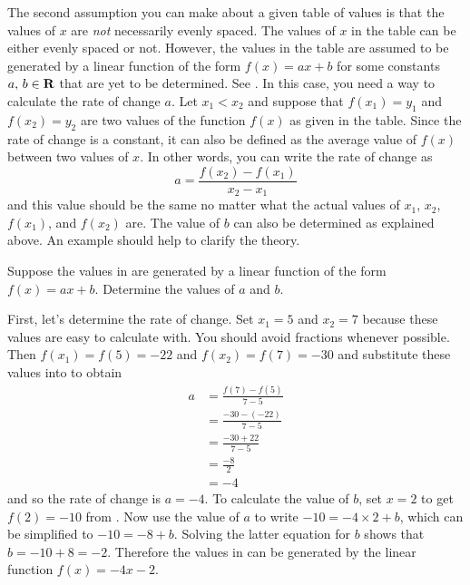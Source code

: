 \documentclass[a4paper,oneside,12pt]{article}
\begin{document}
The second assumption you can make about a given table of values is
that the values of $x$ are \emph{not} necessarily evenly spaced.  The
values of $x$ in the table can be either evenly spaced or not.
However, the values in the table are assumed to be generated by a
linear function of the form $f(x) = ax + b$ for some constants
${a},\, {b} \in \mathbf{R}$ that are yet to be determined.  See
.  In this case, you
need a way to calculate the rate of change $a$.  Let $x_1 < x_2$ and
suppose that $f(x_1) = y_1$ and $f(x_2) = y_2$ are two values of the
function $f(x)$ as given in the table.  Since the rate of change is a
constant, it can also be defined as the average value of $f(x)$
between two values of $x$.  In other words, you can write the rate of
change as
\begin{equation}
\label{eqn:linear_function_rate_of_change}
a
=
\frac{
  f(x_2) - f(x_1)
}{
  x_2 - x_1
}
\end{equation}
and this value should be the same no matter what the actual values of
$x_1$, $x_2$, $f(x_1)$, and $f(x_2)$ are.  The value of $b$ can also
be determined as explained above.  An example should help to clarify
the theory.

\begin{example}
Suppose the values in 
are generated by a linear function of the form $f(x) = ax + b$.
Determine the values of $a$ and $b$.
\end{example}

\begin{solution}
First, let's determine the rate of change.  Set $x_1 = 5$ and
$x_2 = 7$ because these values are easy to calculate with.  You should
avoid fractions whenever possible.  Then $f(x_1) = f(5) = -22$ and
$f(x_2) = f(7) = -30$ and substitute these values into
 to obtain
\begin{align*}
a
&=
\frac{
  f(7) - f(5)
}{
  7 - 5
} \\[4pt]
&=
\frac{
  -30 - (-22)
}{
  7 - 5
} \\[4pt]
&=
\frac{
  -30 + 22
}{
  7 - 5
} \\[4pt]
&=
\frac{
  -8
}{
  2
} \\[4pt]
&=
-4
\end{align*}
and so the rate of change is $a = -4$.  To calculate the value of $b$,
set $x = 2$ to get $f(2) = -10$ from
.  Now use the value of
$a$ to write $-10 = -4 \times 2 + b$, which can be simplified to
$-10 = -8 + b$.  Solving the latter equation for $b$ shows that
$b = -10 + 8 = -2$.  Therefore the values in
 can be generated by
the linear function $f(x) = -4x - 2$.
\end{solution}
\end{document}
